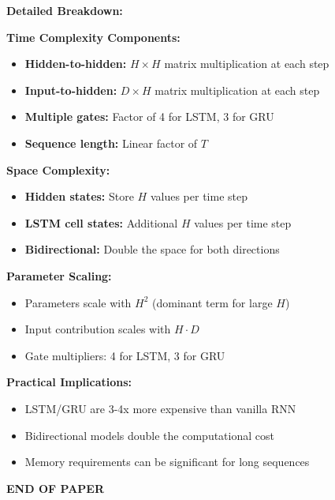 \documentclass[12pt]{article}
\begin{document}
\begin{enumerate}[(a)]
{    \textbf{Detailed Breakdown:}
    
    \textbf{Time Complexity Components:}
    \begin{itemize}
        \item \textbf{Hidden-to-hidden:} $H \times H$ matrix multiplication at each step
        \item \textbf{Input-to-hidden:} $D \times H$ matrix multiplication at each step
        \item \textbf{Multiple gates:} Factor of 4 for LSTM, 3 for GRU
        \item \textbf{Sequence length:} Linear factor of $T$
    \end{itemize}
    
    \textbf{Space Complexity:}
    \begin{itemize}
        \item \textbf{Hidden states:} Store $H$ values per time step
        \item \textbf{LSTM cell states:} Additional $H$ values per time step
        \item \textbf{Bidirectional:} Double the space for both directions
    \end{itemize}
    
    \textbf{Parameter Scaling:}
    \begin{itemize}
        \item Parameters scale with $H^2$ (dominant term for large $H$)
        \item Input contribution scales with $H \cdot D$
        \item Gate multipliers: 4 for LSTM, 3 for GRU
    \end{itemize}
    
    \textbf{Practical Implications:}
    \begin{itemize}
        \item LSTM/GRU are 3-4x more expensive than vanilla RNN
        \item Bidirectional models double the computational cost
        \item Memory requirements can be significant for long sequences
    \end{itemize}
    }
\end{enumerate}

\vfill
\begin{center}{\bf END OF PAPER}\end{center}
\end{document}
